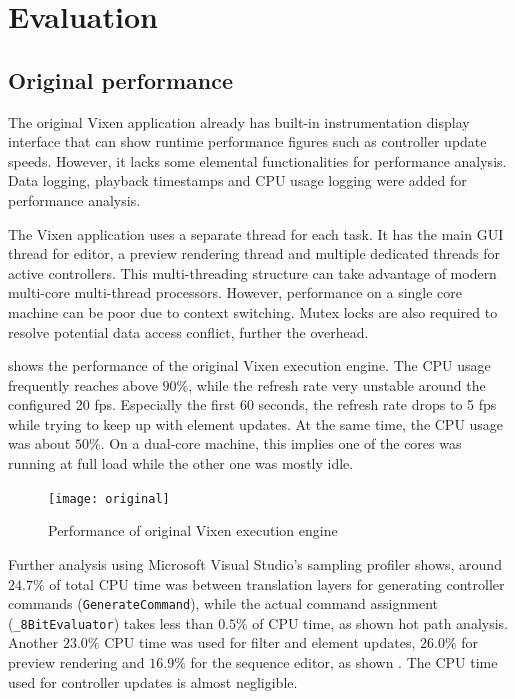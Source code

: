\chapter{Evaluation}
\renewcommand{\baselinestretch}{\mystretch}
\label{chap:Eval}

\section{Original performance}

The original Vixen application already has  built-in instrumentation display interface that can show runtime performance figures such as controller update speeds. However, it lacks some elemental functionalities for performance analysis. Data logging, playback timestamps and CPU usage logging were added for performance analysis.

The Vixen application uses a separate thread for each task. It has the main GUI thread for editor, a preview rendering thread and multiple dedicated threads for active controllers. This multi-threading structure can take advantage of modern multi-core multi-thread processors. However, performance on a single core machine can be poor due to context switching. Mutex locks are also required to resolve potential data access conflict, further  the overhead.

 shows the performance of the original Vixen execution engine. The CPU usage frequently reaches above $90 \%$, while the refresh rate  very unstable around the configured 20 fps. Especially  the first 60 seconds, the refresh rate drops to 5 fps while trying to keep up with element updates. At the same time, the CPU usage was about $50 \%$. On a dual-core machine, this implies one of the cores was running at full load while the other one was mostly idle. 

\begin{figure}[t]
  \centering
  \texttt{[image: original]}
  \caption{\footnotesize Performance of original Vixen execution engine}
  \label{fig:original}
\end{figure}

Further analysis using Microsoft Visual Studio's sampling profiler shows, around $24.7 \%$ of total CPU time was  between translation layers for generating controller commands (\texttt{GenerateCommand}), while the actual command assignment (\texttt{\_8BitEvaluator}) takes less than $0.5 \%$ of CPU time, as shown   hot path analysis. Another $23.0 \%$ CPU time was used for filter and element updates, $26.0 \%$ for preview rendering and $16.9 \%$ for the sequence editor, as shown  . The CPU time used for controller updates is almost negligible.

